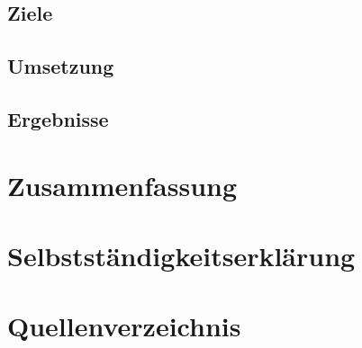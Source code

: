 \documentclass[a4paper, 12pt]{article}
\begin{document}
\subsection{Ziele}
\label{sec:Ziele}


\subsection{Umsetzung}
\label{sec:Umsetzung}

\subsection{Ergebnisse}
\label{sec:Ergebnisse}

\newpage
\section{Zusammenfassung}
\label{sec:Zusammenfassung}

\newpage
\section{Selbstständigkeitserklärung}

\newpage
\section{Quellenverzeichnis}
\printbibliography[keyword={buch},title={Literatur}]
\printbibliography[keyword={internet},title={Onlinequellen}]
\end{document}
